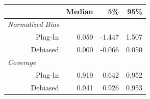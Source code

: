 \begin{tabular}[t]{r|rrr}
\toprule 
& Median & 5\% & 95\% \\
\midrule 
\multicolumn{1}{l|}{\textit{Normalized Bias}} \\
Plug-In & 0.059 & -1.447 & 1.507 \\
Debiased & 0.000 & -0.066 & 0.050 \\
\midrule 
\multicolumn{1}{l|}{\textit{Coverage}} \\
Plug-In & 0.919 & 0.642 & 0.952 \\
Debiased & 0.941 & 0.926 & 0.953 \\
\bottomrule
\end{tabular}